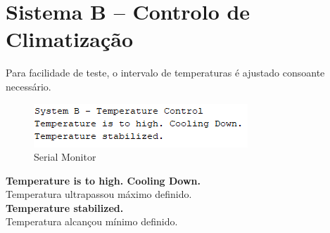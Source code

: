 \section{Sistema B – Controlo de Climatização}

Para facilidade de teste, o intervalo de temperaturas é ajustado consoante necessário.\\

\begin{figure}[H]
    \centering
    \includegraphics{images/testes/sisB_serialmonitor.png}
    \caption{Serial Monitor}
\end{figure}
\textbf{Temperature is to high. Cooling Down.}\\
Temperatura ultrapassou máximo definido.\\
\textbf{Temperature stabilized.}\\
Temperatura alcançou mínimo definido.

